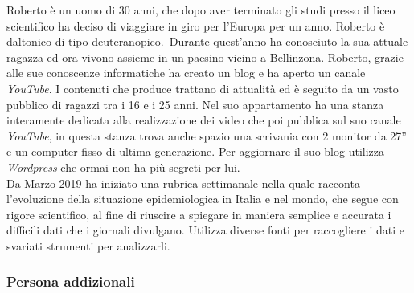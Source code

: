 Roberto è un uomo di 30 anni, che dopo aver terminato gli studi presso il liceo scientifico ha deciso di viaggiare in giro per l'Europa per un anno. Roberto è daltonico di tipo deuteranopico. Durante quest'anno ha conosciuto la sua attuale ragazza ed ora vivono assieme in un paesino vicino a Bellinzona. Roberto, grazie alle sue conoscenze informatiche ha creato un blog e ha aperto un canale \textit{YouTube}. I contenuti che produce trattano di attualità ed è seguito da un vasto pubblico di ragazzi tra i 16 e i 25 anni. Nel suo appartamento ha una stanza interamente dedicata alla realizzazione dei video che poi pubblica sul suo canale \textit{YouTube}, in questa stanza trova anche spazio una scrivania con 2 monitor da 27'' e un computer fisso di ultima generazione. Per aggiornare il suo blog utilizza \textit{Wordpress} che ormai non ha più segreti per lui.\\ 
Da Marzo 2019 ha iniziato una rubrica settimanale nella quale racconta l'evoluzione della situazione epidemiologica in Italia e nel mondo, che segue con rigore scientifico, al fine di riuscire a spiegare in maniera semplice e accurata i difficili dati che i giornali divulgano. Utilizza diverse fonti per raccogliere i dati e svariati strumenti per analizzarli. 
\pagebreak
\subsubsection{Persona addizionali}
